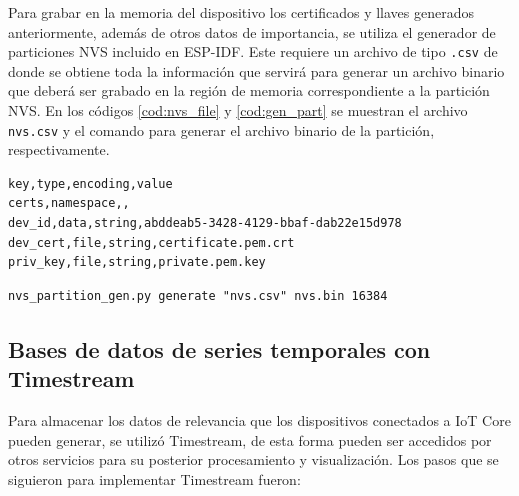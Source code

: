 Para grabar en la memoria del dispositivo los certificados y llaves generados anteriormente, además de otros datos de importancia, se utiliza el generador de particiones NVS incluido en ESP-IDF. Este requiere un archivo de tipo \texttt{.csv} de donde se obtiene toda la información que servirá para generar un archivo binario que deberá ser grabado en la región de memoria correspondiente a la partición NVS. En los códigos \ref{cod:nvs_file} y \ref{cod:gen_part} se muestran el archivo \texttt{nvs.csv} y el comando para generar el archivo binario de la partición, respectivamente.

\begin{lstlisting}[label=cod:nvs_file,caption=Archivo nvs.csv.]
key,type,encoding,value    
certs,namespace,,  
dev_id,data,string,abddeab5-3428-4129-bbaf-dab22e15d978
dev_cert,file,string,certificate.pem.crt
priv_key,file,string,private.pem.key
\end{lstlisting}

\begin{lstlisting}[label=cod:gen_part,caption=Comando para crear una partición con el generador de particiones NVS.]
nvs_partition_gen.py generate "nvs.csv" nvs.bin 16384
\end{lstlisting}

\subsection{Bases de datos de series temporales con Timestream}
Para almacenar los datos de relevancia que los dispositivos conectados a IoT Core pueden generar, se utilizó Timestream, de esta forma pueden ser accedidos por otros servicios para su posterior procesamiento y visualización. Los pasos que se siguieron para implementar Timestream fueron:

